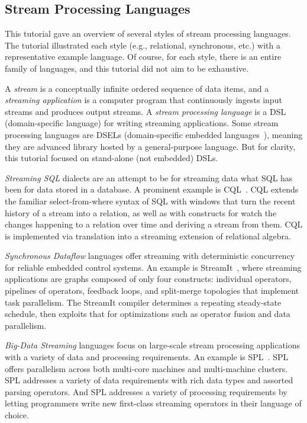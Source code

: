 \subsection{Stream Processing Languages}

This tutorial gave an overview of several styles of stream processing
languages. The tutorial illustrated each style (e.g., relational,
synchronous, etc.) with a representative example language. Of course,
for each style, there is an entire family of languages, and this
tutorial did not aim to be exhaustive.

A \emph{stream} is a conceptually infinite ordered sequence of data
items, and a \emph{streaming application} is a computer program that
continuously ingests input streams and produces output streams.  A
\emph{stream processing language} is a DSL (domain-specific language)
for writing streaming applications. Some stream processing languages
are DSELs (domain-specific embedded languages~\cite{hudak_1998}),
meaning they are advanced library hosted by a general-purpose
language. But for clarity, this tutorial focused on stand-alone (not
embedded) DSLs.

\emph{Streaming SQL} dialects are an attempt to be for streaming data
what SQL has been for data stored in a database. A prominent example
is CQL~\cite{arasu_babu_widom_2006}. CQL extends the familiar
select-from-where syntax of SQL with windows that turn the recent
history of a stream into a relation, as well as with constructs for
watch the changes happening to a relation over time and deriving a
stream from them. CQL is implemented via translation into a streaming
extension of relational algebra.

\emph{Synchronous Dataflow} languages offer streaming with
deterministic concurrency for reliable embedded control systems. An
example is StreamIt~\cite{thies_et_al_2002}, where streaming
applications are graphs composed of only four constructs: individual
operators, pipe\-lines of operators, feedback loops, and split-merge
topologies that implement task parallelism. The StreamIt compiler
determines a repeating steady-state schedule, then exploits that for
optimizations such as operator fusion and data parallelism.

\emph{Big-Data Streaming} languages focus on large-scale stream
processing applications with a variety of data and processing
requirements. An example is SPL~\cite{hirzel_schneider_gedik_2017}.
SPL offers parallelism across both multi-core machines and
multi-machine clusters. SPL addresses a variety of data requirements
with rich data types and assorted parsing operators. And SPL addresses
a variety of processing requirements by letting programmers write new
first-class streaming operators in their language of choice.

